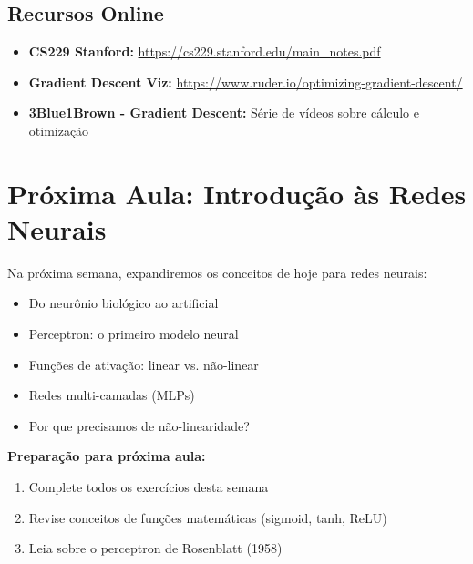 \documentclass[a4paper,12pt]{article}
\begin{document}
\subsection{Recursos Online}
\begin{itemize}
    \item \textbf{CS229 Stanford:} \url{https://cs229.stanford.edu/main_notes.pdf}
    \item \textbf{Gradient Descent Viz:} \url{https://www.ruder.io/optimizing-gradient-descent/}
    \item \textbf{3Blue1Brown - Gradient Descent:} Série de vídeos sobre cálculo e otimização
\end{itemize}

\section{Próxima Aula: Introdução às Redes Neurais}

Na próxima semana, expandiremos os conceitos de hoje para redes neurais:

\begin{itemize}
    \item Do neurônio biológico ao artificial
    \item Perceptron: o primeiro modelo neural
    \item Funções de ativação: linear vs. não-linear
    \item Redes multi-camadas (MLPs)
    \item Por que precisamos de não-linearidade?
\end{itemize}

\textbf{Preparação para próxima aula:}
\begin{enumerate}
    \item Complete todos os exercícios desta semana
    \item Revise conceitos de funções matemáticas (sigmoid, tanh, ReLU)
    \item Leia sobre o perceptron de Rosenblatt (1958)
\end{enumerate}
\end{document}
